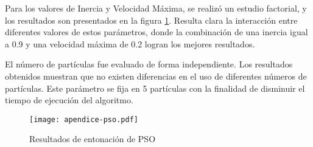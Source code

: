 Para los valores de Inercia y Velocidad Máxima, se realizó un estudio factorial, y los resultados son presentados en la figura \ref{fig-ap-pso}. Resulta clara la interacción entre diferentes valores de estos parámetros, donde la combinación de una inercia igual a 0.9 y una velocidad máxima de 0.2 logran los mejores resultados.

El número de partículas fue evaluado de forma independiente. Los resultados obtenidos muestran que no existen diferencias en el uso de diferentes números de partículas. Este parámetro se fija en 5 partículas con la finalidad de disminuir el tiempo de ejecución del algoritmo.

\begin{figure}[h!]
\centering
\texttt{[image: apendice-pso.pdf]}
\caption{Resultados de entonación de PSO}
\label{fig-ap-pso}
\end{figure}
